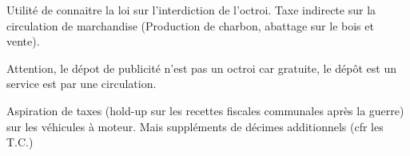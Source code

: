 \documentclass{book}
\begin{document}
Utilité de connaitre la loi sur l'interdiction de l'octroi. Taxe indirecte sur la circulation de marchandise (Production de charbon, abattage sur le bois et vente).

Attention, le dépot de publicité n'est pas un octroi car gratuite, le dépôt est un service est par une circulation.

Aspiration de taxes (hold-up sur les recettes fiscales communales après la guerre) sur les véhicules à moteur. Mais suppléments de décimes additionnels (cfr les T.C.)




















\nocite{*}

\end{document}
